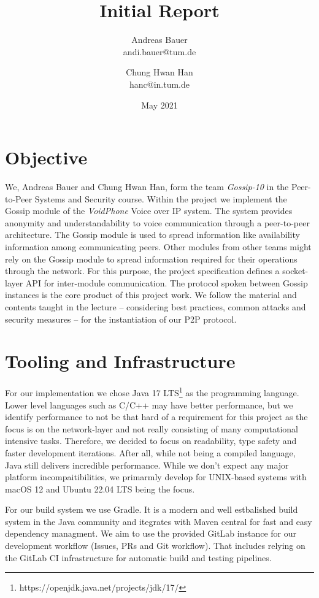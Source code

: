 \documentclass[a4paper, 11pt]{article}
\title{Initial Report}
\author{
    Andreas Bauer\\
    andi.bauer@tum.de
  \and
    Chung Hwan Han\\
    hanc@in.tum.de
}
\date{May 2021}
\begin{document}
    \maketitle

    \section{Objective}\label{sec:objective}

    We, Andreas Bauer and Chung Hwan Han, form the team \textit{Gossip-10} in the Peer-to-Peer Systems and Security course.
    Within the project we implement the Gossip module of the \textit{VoidPhone} Voice over IP system.
    The system provides anonymity and understandability to voice communication through a peer-to-peer architecture.
    The Gossip module is used to spread information like availability information among communicating peers.
    Other modules from other teams might rely on the Gossip module to spread information required for their operations
    through the network.
    For this purpose, the project specification defines a socket-layer API for inter-module communication.
    The protocol spoken between Gossip instances is the core product of this project work.
    We follow the material and contents taught in the lecture -- considering best practices, common attacks and security measures --
    for the instantiation of our P2P protocol.

    \section{Tooling and Infrastructure}\label{sec:tooling-and-infrastructure}
    For our implementation we chose Java 17 LTS\footnote{https://openjdk.java.net/projects/jdk/17/} as the programming language.
    Lower level languages such as C/C++ may have better performance, but we identify performance to not be that hard of a requirement for this project
    as the focus is on the network-layer and not really consisting of many computational intensive tasks.
    Therefore, we decided to focus on readability, type safety and faster development iterations.
    After all, while not being a compiled language, Java still delivers incredible performance.
    While we don't expect any major platform incompaitibilities, we primarmly develop for UNIX-based systems with macOS 12 and Ubuntu 22.04 LTS being the focus.

    For our build system we use Gradle.
    It is a modern and well estbalished build system in the Java community and itegrates with Maven central for fast and easy dependency managment.
    We aim to use the provided GitLab instance for our development workflow (Issues, PRs and Git workflow).
    That includes relying on the GitLab CI infrastructure for automatic build and testing pipelines.
\end{document}
